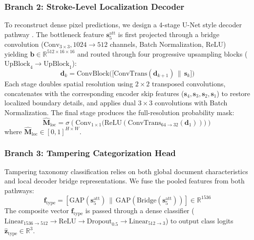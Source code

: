 \documentclass[pdflatex,sn-mathphys-num,iicol]{sn-jnl}
\begin{document}
\subsubsection{Branch 2: Stroke-Level Localization Decoder}
To reconstruct dense pixel predictions, we design a 4-stage U-Net style decoder pathway \cite{bib6}. The bottleneck feature $\mathbf{s}_5^{\text{att}}$ is first projected through a bridge convolution ($\text{Conv}_{3 \times 3}, 1024 \rightarrow 512$ channels, Batch Normalization, ReLU) yielding $\mathbf{b} \in \mathbb{R}^{512 \times 16 \times 16}$ and routed through four progressive upsampling blocks ($\text{UpBlock}_4 \rightarrow \text{UpBlock}_1$):
\begin{equation}
\mathbf{d}_k = \text{ConvBlock}\Big(\big[\text{ConvTrans}(\mathbf{d}_{k+1}) \,\|\, \mathbf{s}_k\big]\Big)\label{eq_upblock}
\end{equation}
Each stage doubles spatial resolution using $2 \times 2$ transposed convolutions, concatenates with the corresponding encoder skip features ($\mathbf{s}_4, \mathbf{s}_3, \mathbf{s}_2, \mathbf{s}_1$) to restore localized boundary details, and applies dual $3 \times 3$ convolutions with Batch Normalization. The final stage produces the full-resolution probability mask:
\begin{equation}
\hat{\mathbf{M}}_{\text{loc}} = \sigma\left(\text{Conv}_{1 \times 1}\big(\text{ReLU}(\text{ConvTrans}_{64 \rightarrow 32}(\mathbf{d}_1))\big)\right)\label{eq_seg_head}
\end{equation}
where $\hat{\mathbf{M}}_{\text{loc}} \in [0, 1]^{H \times W}$.

\subsubsection{Branch 3: Tampering Categorization Head}
Tampering taxonomy classification relies on both global document characteristics and local decoder bridge representations. We fuse the pooled features from both pathways:
\begin{equation}
\mathbf{f}_{\text{type}} = [\text{GAP}(\mathbf{s}_5^{\text{att}}) \,\|\, \text{GAP}(\text{Bridge}(\mathbf{s}_5^{\text{att}}))] \in \mathbb{R}^{1536}\label{eq_type_feat}
\end{equation}
The composite vector $\mathbf{f}_{\text{type}}$ is passed through a dense classifier ($\text{Linear}_{1536 \rightarrow 512} \rightarrow \text{ReLU} \rightarrow \text{Dropout}_{0.5} \rightarrow \text{Linear}_{512 \rightarrow 3}$) to output class logits $\hat{\mathbf{z}}_{\text{type}} \in \mathbb{R}^3$.
\end{document}
